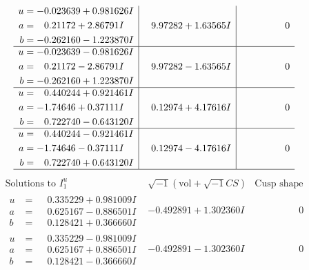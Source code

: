 \documentclass[1p]{elsarticle_modified}
\theoremstyle{definition}
\newcommand{\I}{\sqrt{-1}}
\begin{document}
$$\begin{array}{c|c|c}
\begin{aligned}
u &= -0.023639 + 0.981626 I \\
a &= \phantom{-}0.21172 + 2.86791 I \\
b &= -0.262160 - 1.223870 I\end{aligned}
 & \phantom{-}9.97282 + 1.63565 I & \phantom{-0.000000 } 0 \\ \hline\begin{aligned}
u &= -0.023639 - 0.981626 I \\
a &= \phantom{-}0.21172 - 2.86791 I \\
b &= -0.262160 + 1.223870 I\end{aligned}
 & \phantom{-}9.97282 - 1.63565 I & \phantom{-0.000000 } 0 \\ \hline\begin{aligned}
u &= \phantom{-}0.440244 + 0.921461 I \\
a &= -1.74646 + 0.37111 I \\
b &= \phantom{-}0.722740 - 0.643120 I\end{aligned}
 & \phantom{-}0.12974 + 4.17616 I & \phantom{-0.000000 } 0 \\ \hline\begin{aligned}
u &= \phantom{-}0.440244 - 0.921461 I \\
a &= -1.74646 - 0.37111 I \\
b &= \phantom{-}0.722740 + 0.643120 I\end{aligned}
 & \phantom{-}0.12974 - 4.17616 I & \phantom{-0.000000 } 0\\
 \hline 
 \end{array}$$\newpage$$\begin{array}{c|c|c}  
\text{Solutions to }I^u_{1}& \I (\text{vol} + \sqrt{-1}CS) & \text{Cusp shape}\\
 \hline 
\begin{aligned}
u &= \phantom{-}0.335229 + 0.981009 I \\
a &= \phantom{-}0.625167 - 0.886501 I \\
b &= \phantom{-}0.128421 + 0.366660 I\end{aligned}
 & -0.492891 + 1.302360 I & \phantom{-0.000000 } 0 \\ \hline\begin{aligned}
u &= \phantom{-}0.335229 - 0.981009 I \\
a &= \phantom{-}0.625167 + 0.886501 I \\
b &= \phantom{-}0.128421 - 0.366660 I\end{aligned}
 & -0.492891 - 1.302360 I & \phantom{-0.000000 } 0 \\ \hline\begin{aligned}

\end{aligned}
\end{array}$$
\end{document}
